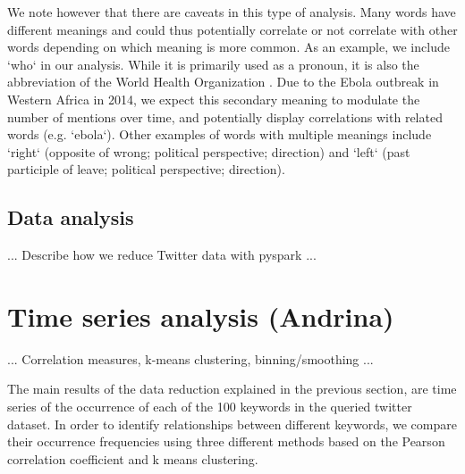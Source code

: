 \documentclass[12pt, a4paper]{article}
\begin{document}
We note however that there are caveats in this type of analysis. Many words have different meanings and could thus potentially correlate or not correlate with other words depending on which meaning is more common. As an example, we include `who` in our analysis. While it is primarily used as a pronoun, it is also the abbreviation of the World Health Organization \cite{who}. Due to the Ebola outbreak in Western Africa in 2014, we expect this secondary meaning to modulate the number of mentions over time, and potentially display correlations with related words (e.g. `ebola`). Other examples of words with multiple meanings include `right` (opposite of wrong; political perspective; direction) and `left` (past participle of leave; political perspective; direction).

\subsection{Data analysis}
... Describe how we reduce Twitter data with pyspark ...


\section{Time series analysis (Andrina)}
... Correlation measures, k-means clustering, binning/smoothing ...

The main results of the data reduction explained in the previous section, are time series of the occurrence of each of the 100 keywords in the queried twitter dataset. In order to identify relationships between different keywords, we compare their occurrence frequencies using three different methods based on the Pearson correlation coefficient and k means clustering. 
\end{document}
